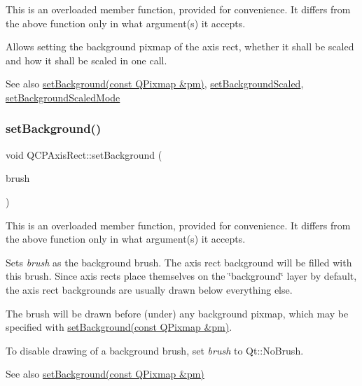 This is an overloaded member function, provided for convenience. It differs from the above function only in what argument(s) it accepts.

Allows setting the background pixmap of the axis rect, whether it shall be scaled and how it shall be scaled in one call.

\begin{DoxySeeAlso}{See also}
\hyperlink{class_q_c_p_axis_rect_af615ab5e52b8e0a9a0eff415b6559db5}{set\+Background(const Q\+Pixmap \&pm)}, \hyperlink{class_q_c_p_axis_rect_ae6d36c3e0e968ffb991170a018e7b503}{set\+Background\+Scaled}, \hyperlink{class_q_c_p_axis_rect_a5ef77ea829c9de7ba248e473f48f7305}{set\+Background\+Scaled\+Mode} 
\end{DoxySeeAlso}
\mbox{\label{class_q_c_p_axis_rect_a22a22b8668735438dc06f9a55fe46b33}} 
\subsubsection{\texorpdfstring{set\+Background()}{setBackground()}\hspace{0.1cm}{\footnotesize\ttfamily [3/3]}}
{\footnotesize\ttfamily void Q\+C\+P\+Axis\+Rect\+::set\+Background (\begin{DoxyParamCaption}\item[{const Q\+Brush \&}]{brush }\end{DoxyParamCaption})}

This is an overloaded member function, provided for convenience. It differs from the above function only in what argument(s) it accepts.

Sets {\itshape brush} as the background brush. The axis rect background will be filled with this brush. Since axis rects place themselves on the \char`\"{}background\char`\"{} layer by default, the axis rect backgrounds are usually drawn below everything else.

The brush will be drawn before (under) any background pixmap, which may be specified with \hyperlink{class_q_c_p_axis_rect_af615ab5e52b8e0a9a0eff415b6559db5}{set\+Background(const Q\+Pixmap \&pm)}.

To disable drawing of a background brush, set {\itshape brush} to Qt\+::\+No\+Brush.

\begin{DoxySeeAlso}{See also}
\hyperlink{class_q_c_p_axis_rect_af615ab5e52b8e0a9a0eff415b6559db5}{set\+Background(const Q\+Pixmap \&pm)} 
\end{DoxySeeAlso}
\mbox{\label{class_q_c_p_axis_rect_ae6d36c3e0e968ffb991170a018e7b503}} 
